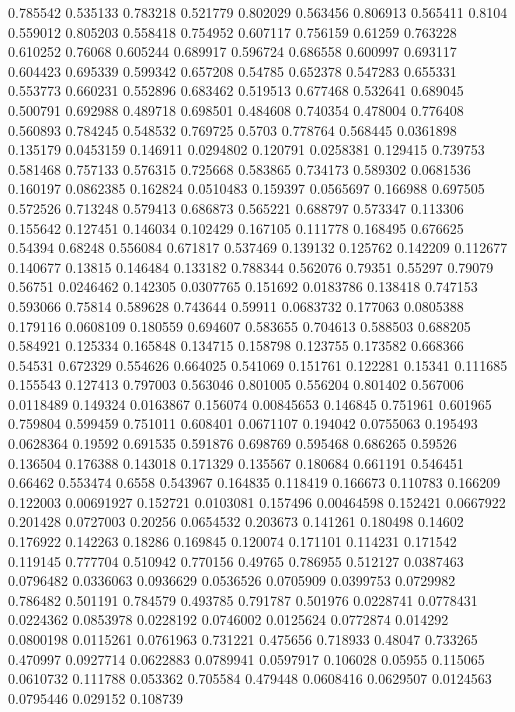 0.785542 0.535133
0.783218 0.521779
0.802029 0.563456
0.806913 0.565411
0.8104 0.559012
0.805203 0.558418
0.754952 0.607117
0.756159 0.61259
0.763228 0.610252
0.76068 0.605244
0.689917 0.596724
0.686558 0.600997
0.693117 0.604423
0.695339 0.599342
0.657208 0.54785
0.652378 0.547283
0.655331 0.553773
0.660231 0.552896
0.683462 0.519513
0.677468 0.532641
0.689045 0.500791
0.692988 0.489718
0.698501 0.484608
0.740354 0.478004
0.776408 0.560893
0.784245 0.548532
0.769725 0.5703
0.778764 0.568445
0.0361898 0.135179
0.0453159 0.146911
0.0294802 0.120791
0.0258381 0.129415
0.739753 0.581468
0.757133 0.576315
0.725668 0.583865
0.734173 0.589302
0.0681536 0.160197
0.0862385 0.162824
0.0510483 0.159397
0.0565697 0.166988
0.697505 0.572526
0.713248 0.579413
0.686873 0.565221
0.688797 0.573347
0.113306 0.155642
0.127451 0.146034
0.102429 0.167105
0.111778 0.168495
0.676625 0.54394
0.68248 0.556084
0.671817 0.537469
0.139132 0.125762
0.142209 0.112677
0.140677 0.13815
0.146484 0.133182
0.788344 0.562076
0.79351 0.55297
0.79079 0.56751
0.0246462 0.142305
0.0307765 0.151692
0.0183786 0.138418
0.747153 0.593066
0.75814 0.589628
0.743644 0.59911
0.0683732 0.177063
0.0805388 0.179116
0.0608109 0.180559
0.694607 0.583655
0.704613 0.588503
0.688205 0.584921
0.125334 0.165848
0.134715 0.158798
0.123755 0.173582
0.668366 0.54531
0.672329 0.554626
0.664025 0.541069
0.151761 0.122281
0.15341 0.111685
0.155543 0.127413
0.797003 0.563046
0.801005 0.556204
0.801402 0.567006
0.0118489 0.149324
0.0163867 0.156074
0.00845653 0.146845
0.751961 0.601965
0.759804 0.599459
0.751011 0.608401
0.0671107 0.194042
0.0755063 0.195493
0.0628364 0.19592
0.691535 0.591876
0.698769 0.595468
0.686265 0.59526
0.136504 0.176388
0.143018 0.171329
0.135567 0.180684
0.661191 0.546451
0.66462 0.553474
0.6558 0.543967
0.164835 0.118419
0.166673 0.110783
0.166209 0.122003
0.00691927 0.152721
0.0103081 0.157496
0.00464598 0.152421
0.0667922 0.201428
0.0727003 0.20256
0.0654532 0.203673
0.141261 0.180498
0.14602 0.176922
0.142263 0.18286
0.169845 0.120074
0.171101 0.114231
0.171542 0.119145
0.777704 0.510942
0.770156 0.49765
0.786955 0.512127
0.0387463 0.0796482
0.0336063 0.0936629
0.0536526 0.0705909
0.0399753 0.0729982
0.786482 0.501191
0.784579 0.493785
0.791787 0.501976
0.0228741 0.0778431
0.0224362 0.0853978
0.0228192 0.0746002
0.0125624 0.0772874
0.014292 0.0800198
0.0115261 0.0761963
0.731221 0.475656
0.718933 0.48047
0.733265 0.470997
0.0927714 0.0622883
0.0789941 0.0597917
0.106028 0.05955
0.115065 0.0610732
0.111788 0.053362
0.705584 0.479448
0.0608416 0.0629507
0.0124563 0.0795446
0.029152 0.108739
